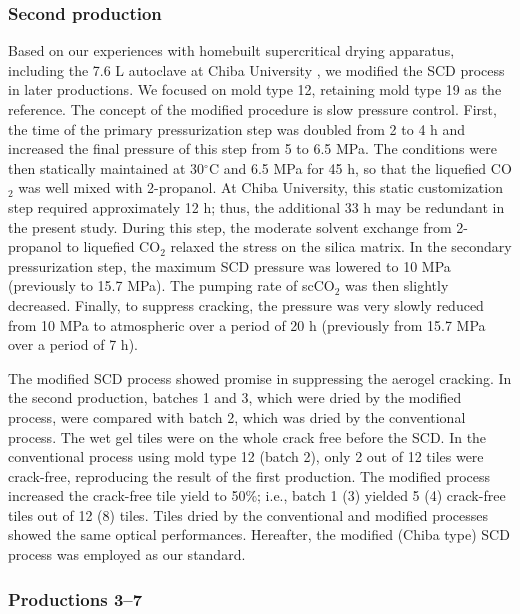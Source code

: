 \documentclass[5p,twocolumn]{elsarticle}
\begin{document}
\subsubsection{Second production}
\label{5-1-2}

Based on our experiences with homebuilt supercritical drying apparatus, including the 7.6 L autoclave at Chiba University \cite{cite2}, we modified the SCD process in later productions. We focused on mold type 12, retaining mold type 19 as the reference. The concept of the modified procedure is slow pressure control. First, the time of the primary pressurization step was doubled from 2 to 4 h and increased the final pressure of this step from 5 to 6.5 MPa. The conditions were then statically maintained at 30$^{\circ }$C and 6.5 MPa for 45 h, so that the liquefied CO$_2$ was well mixed with 2-propanol. At Chiba University, this static customization step required approximately 12 h; thus, the additional 33 h may be redundant in the present study. During this step, the moderate solvent exchange from 2-propanol to liquefied CO$_2$ relaxed the stress on the silica matrix. In the secondary pressurization step, the maximum SCD pressure was lowered to 10 MPa (previously to 15.7 MPa). The pumping rate of scCO$_2$ was then slightly decreased. Finally, to suppress cracking, the pressure was very slowly reduced from 10 MPa to atmospheric over a period of 20 h (previously from 15.7 MPa over a period of 7 h).

The modified SCD process showed promise in suppressing the aerogel cracking. In the second production, batches 1 and 3, which were dried by the modified process, were compared with batch 2, which was dried by the conventional process. The wet gel tiles were on the whole crack free before the SCD. In the conventional process using mold type 12 (batch 2), only 2 out of 12 tiles were crack-free, reproducing the result of the first production. The modified process increased the crack-free tile yield to 50\%; i.e., batch 1 (3) yielded 5 (4) crack-free tiles out of 12 (8) tiles. Tiles dried by the conventional and modified processes showed the same optical performances. Hereafter, the modified (Chiba type) SCD process was employed as our standard.

\subsubsection{Productions 3--7}
\label{5-1-3}
\end{document}
